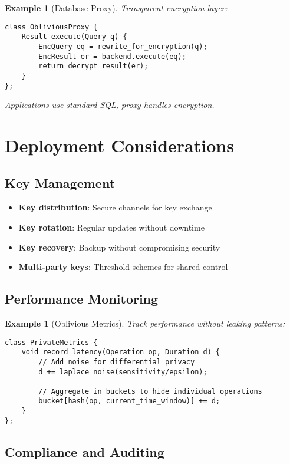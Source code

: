 \documentclass[11pt,final]{article}
\newtheorem{example}[theorem]{Example}
\begin{document}
\begin{example}[Database Proxy]
Transparent encryption layer:
\begin{verbatim}
class ObliviousProxy {
    Result execute(Query q) {
        EncQuery eq = rewrite_for_encryption(q);
        EncResult er = backend.execute(eq);
        return decrypt_result(er);
    }
};
\end{verbatim}
Applications use standard SQL, proxy handles encryption.
\end{example}

\section{Deployment Considerations}

\subsection{Key Management}

\begin{itemize}
    \item \textbf{Key distribution}: Secure channels for key exchange
    \item \textbf{Key rotation}: Regular updates without downtime
    \item \textbf{Key recovery}: Backup without compromising security
    \item \textbf{Multi-party keys}: Threshold schemes for shared control
\end{itemize}

\subsection{Performance Monitoring}

\begin{example}[Oblivious Metrics]
Track performance without leaking patterns:
\begin{verbatim}
class PrivateMetrics {
    void record_latency(Operation op, Duration d) {
        // Add noise for differential privacy
        d += laplace_noise(sensitivity/epsilon);
        
        // Aggregate in buckets to hide individual operations
        bucket[hash(op, current_time_window)] += d;
    }
};
\end{verbatim}
\end{example}

\subsection{Compliance and Auditing}
\end{document}
